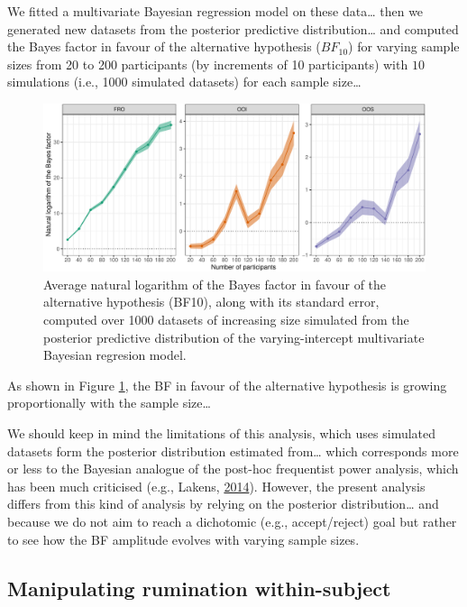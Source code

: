 \documentclass[
  english,
  man,floatsintext]{apa6}
\begin{document}
We fitted a multivariate Bayesian regression model on these data\ldots{} then we generated new datasets from the posterior predictive distribution\ldots{} and computed the Bayes factor in favour of the alternative hypothesis (\(BF_{10}\)) for varying sample sizes from 20 to 200 participants (by increments of 10 participants) with \(10\) simulations (i.e., 1000 simulated datasets) for each sample size\ldots{}

\begin{figure}[!htb]

{\centering \includegraphics[width=1\linewidth]{reanalysis_files/figure-latex/simulated-power-1} 

}

\caption{Average natural logarithm of the Bayes factor in favour of the alternative hypothesis (BF10), along with its standard error, computed over 1000 datasets of increasing size simulated from the posterior predictive distribution of the varying-intercept multivariate Bayesian regresion model.}\label{fig:simulated-power}
\end{figure}

As shown in Figure \ref{fig:simulated-power}, the BF in favour of the alternative hypothesis is growing proportionally with the sample size\ldots{}

We should keep in mind the limitations of this analysis, which uses simulated datasets form the posterior distribution estimated from\ldots{} which corresponds more or less to the Bayesian analogue of the post-hoc frequentist power analysis, which has been much criticised (e.g., Lakens, \protect\hyperlink{ref-lakens_20_2014}{2014}). However, the present analysis differs from this kind of analysis by relying on the posterior distribution\ldots{} and because we do not aim to reach a dichotomic (e.g., accept/reject) goal but rather to see how the BF amplitude evolves with varying sample sizes.

\hypertarget{manipulating-rumination-within-subject}{%
\subsection{Manipulating rumination within-subject}\label{manipulating-rumination-within-subject}}
\end{document}
